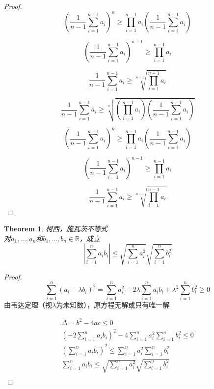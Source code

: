 \documentclass[10pt,a4paper]{book}
\newtheorem{theorem}{Theorem}[section]
\begin{document}
\begin{proof}
	\begin{equation}	
		(\frac{1}{n-1}\sum_{i=1}^{n-1}a_i)^n
		\geq \prod_{i=1}^{n-1}a_i(\frac{1}{n-1}\sum_{i=1}^{n-1}a_i)
	\end{equation}
	

	\begin{equation}	
		(\frac{1}{n-1}\sum_{i=1}^{n-1}a_i)^{n-1}
		\geq \prod_{i=1}^{n-1}a_i
	\end{equation}


	\begin{equation}		
		\frac{1}{n-1}\sum_{i=1}^{n-1}a_i
		\geq \sqrt[n-1]{\prod_{i=1}^{n-1}a_i}
	\end{equation}


	\begin{equation}
		\frac{1}{n-1}\sum_{i=1}^{n-1}a_i \geq \sqrt[n]{(\prod_{i=1}^{n-1}a_i)(\frac{1}{n-1}\sum_{i=1}^{n-1}a_i)}
	\end{equation}
	
	\begin{equation}
		( \frac{1}{n-1}\sum_{i=1}^{n-1}a_i )^n \geq \prod_{i=1}^{n-1}a_i(\frac{1}{n-1}\sum_{i=1}^{n-1}a_i)
	\end{equation}

	\begin{equation}
		( \frac{1}{n-1}\sum_{i=1}^{n-1}a_i )^{n-1} \geq \prod_{i=1}^{n-1}a_i
	\end{equation}
	
	\begin{equation}
		 \frac{1}{n-1}\sum_{i=1}^{n-1}a_i  \geq \sqrt[n-1]{\prod_{i=1}^{n-1}a_i}
	\end{equation}
	
	\end{proof}
	
	\begin{theorem}
		柯西，施瓦茨不等式\\	
		对$ a_1,\dots,a_n $和$ b_1, \dots ,b_n \in \mathbb{R}$，成立
		\begin{equation}
			|\sum_{i=1}^n a_ib_i|\leq \sqrt{\sum_{i=1}^n a_i^2}\sqrt{\sum_{i=1}^n b_i^2}
		\end{equation}
		\label{1.3.5}
	\end{theorem}
	\begin{proof}
		\[ \sum_{i=1}^n (a_i - \lambda b_i)^2 = \sum_{i=1}^n a_i^2 - 2\lambda \sum_{i=1}^n a_i b_i + \lambda^2 \sum_{i=1}^n b_i^2 \geq 0  \]
		由韦达定理（视$ \lambda $为未知数），原方程无解或只有唯一解
		
		\begin{equation}
			\begin{aligned}
				 \Delta = b^2-4ac \leq 0\\
				 (-2\sum_{i=1}^n a_i b_i)^2-4\sum_{i=1}^na_i^2\sum_{i=1}^nb_i^2\leq 0\\	
				 (\sum_{i=1}^n a_i b_i)^2 \leq \sum_{i=1}^na_i^2\sum_{i=1}^nb_i^2\\
				 \sum_{i=1}^n a_i b_i \leq \sqrt{\sum_{i=1}^na_i^2}\sqrt{\sum_{i=1}^nb_i^2}\\
			 \end{aligned}
		\end{equation}
	\end{proof}
\end{document}
